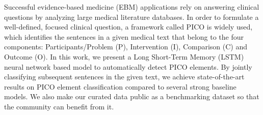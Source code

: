 Successful evidence-based medicine (EBM) applications rely on answering clinical questions by analyzing large medical literature databases. In order to formulate a well-defined, focused clinical question, a framework called PICO is widely used, which identifies the sentences in a given medical text that belong to the four components: Participants/Problem (P), Intervention (I), Comparison (C) and Outcome (O). In this work, we present a Long Short-Term Memory (LSTM) neural network based model to automatically detect PICO elements. By jointly classifying subsequent sentences in the given text, we achieve state-of-the-art results on PICO element classification compared to several strong baseline models. We also make our curated data public as a benchmarking dataset so that the community can benefit from it.
